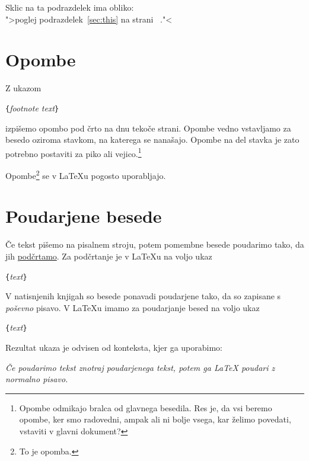 \begin{example}
Sklic na ta podrazdelek
\label{sec:this} ima obliko:\\
">poglej podrazdelek~\ref{sec:this} 
na strani ~\pageref{sec:this}."<
\end{example}
 
\section{Opombe}
Z ukazom
\begin{lscommand}
\verb|{|\emph{footnote text}\verb|}|
\end{lscommand}
\noindent izpišemo opombo pod črto na dnu tekoče strani.  Opombe vedno vstavljamo 
za besedo oziroma stavkom, na katerega se nanašajo. Opombe na del stavka je 
zato potrebno postaviti za piko ali vejico.\footnote{Opombe odmikajo bralca od glavnega besedila. Res je,
da vsi beremo opombe, ker smo radovedni, ampak ali ni bolje vsega, kar želimo povedati,  vstaviti v 
glavni dokument?\footnotemark}

\begin{example}
Opombe\footnote{To je 
opomba.} se v \LaTeX{}u 
pogosto uporabljajo.
\end{example}
  
\section{Poudarjene besede}

Če tekst pišemo na pisalnem stroju, potem pomembne besede poudarimo tako, da jih
\underline{podčrtamo}. Za podčrtanje je v \LaTeX{}u na voljo ukaz
\begin{lscommand}
\verb|{|\emph{text}\verb|}|
\end{lscommand}
\noindent V natisnjenih knjigah so besede ponavadi poudarjene tako, da so zapisane
s \emph{poševno} pisavo.  V \LaTeX{}u imamo za poudarjanje besed na voljo ukaz
\begin{lscommand}
\verb|{|\emph{text}\verb|}|
\end{lscommand}
\noindent Rezultat ukaza je odvisen od konteksta, kjer ga uporabimo:

\begin{example}
\emph{Če poudarimo
  tekst znotraj poudarjenega 
  tekst, potem ga \LaTeX{} 
  poudari z \emph{normalno} 
  pisavo.}
\end{example}

